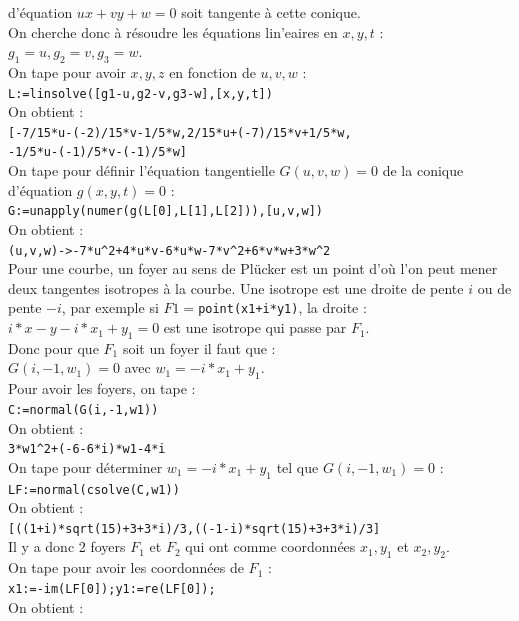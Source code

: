 \documentclass[a4paper,11pt]{book}
\begin{document}
d'\'equation $ux+vy+w=0$ soit tangente \`a cette conique.\\
On cherche donc \`a r\'esoudre les \'equations lin'eaires en $x,y,t$ :\\
$g_1=u,g_2=v,g_3=w$.\\
On tape pour avoir $x,y,z$ en fonction de $u,v,w$ :\\
{\tt L:=linsolve([g1-u,g2-v,g3-w],[x,y,t])}\\
On obtient :\\
{\tt [-7/15*u-(-2)/15*v-1/5*w,2/15*u+(-7)/15*v+1/5*w,}\\
{\tt -1/5*u-(-1)/5*v-(-1)/5*w]}\\
On tape pour d\'efinir l'\'equation tangentielle $G(u,v,w)=0$ de la conique
d'\'equation $g(x,y,t)=0$ :\\
{\tt G:=unapply(numer(g(L[0],L[1],L[2])),[u,v,w])}\\
On obtient :\\
{\tt  (u,v,w)->-7*u\verb|^|2+4*u*v-6*u*w-7*v\verb|^|2+6*v*w+3*w\verb|^|2}\\
Pour une courbe, un foyer au sens de Plücker est un point d'o\`u l'on peut 
mener deux tangentes isotropes \`a la courbe.
Une isotrope est une droite de pente $i$ ou de pente $-i$, par exemple si 
$F1=${\tt point(x1+i*y1)}, la droite :\\
$i*x-y-i*x_1+y_1=0$ est une isotrope qui passe par $F_1$.\\
Donc pour que $F_1$ soit un foyer il faut que :\\
$G(i,-1,w_1)=0$ avec $w_1=-i*x_1+y_1$.\\
Pour avoir les foyers, on tape :\\
{\tt C:=normal(G(i,-1,w1))}\\
On obtient :\\
{\tt 3*w1\verb|^|2+(-6-6*i)*w1-4*i}\\
On tape pour d\'eterminer $w_1=-i*x_1+y_1$ tel que $G(i,-1,w_1)=0$ :\\
{\tt LF:=normal(csolve(C,w1))}\\
On obtient :\\
{\tt [((1+i)*sqrt(15)+3+3*i)/3,((-1-i)*sqrt(15)+3+3*i)/3]}\\
Il y a donc 2 foyers $F_1$ et $F_2$ qui ont comme coordonn\'ees $x_1,y_1$ et 
$x_2,y_2$.\\
On tape pour avoir les coordonn\'ees de $F_1$ :\\
{\tt x1:=-im(LF[0]);y1:=re(LF[0]);}\\
On obtient :\\
\end{document}
